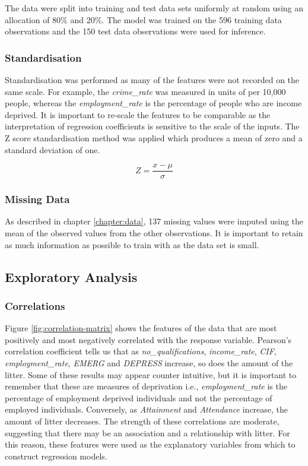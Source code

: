 \documentclass{thesis}
\begin{document}
The data were split into training and test data sets uniformly at random using an allocation of 80\% and 20\%. The model was trained on the 596 training data observations and the 150 test data observations were used for inference.

\subsubsection{Standardisation} 

Standardisation was performed as many of the features were not recorded on the same scale. For example, the \textit{crime\_rate} was measured in units of per 10,000 people, whereas the \textit{employment\_rate} is the percentage of people who are income deprived. It is important to re-scale the features to be comparable as the interpretation of regression coefficients is sensitive to the scale of the inputs. The Z score standardisation method was applied which produces a mean of zero and a standard deviation of one.

\begin{equation}
    Z = \frac{x - \mu}{\sigma}
\end{equation}

\subsubsection{Missing Data} 

As described in chapter \ref{chapter:data}, 137 missing values were imputed using the mean of the observed values from the other observations. It is important to retain as much information as possible to train with as the data set is small.

\subsection{Exploratory Analysis}

\subsubsection{Correlations}

Figure \ref{fig:correlation-matrix} shows the features of the data that are most positively and most negatively correlated with the response variable. Pearson's correlation coefficient tells us that as \textit{no\_qualifications}, \textit{income\_rate}, \textit{CIF}, \textit{employment\_rate}, \textit{EMERG} and \textit{DEPRESS} increase, so does the amount of the litter. Some of these results may appear counter intuitive, but it is important to remember that these are measures of deprivation i.e., \textit{employment\_rate} is the percentage of employment deprived individuals and not the percentage of employed individuals. Conversely, as \textit{Attainment} and \textit{Attendance} increase, the amount of litter decreases. The strength of these correlations are moderate, suggesting that there may be an association and a relationship with litter. For this reason, these features were used as the explanatory variables from which to construct regression models.
\end{document}
